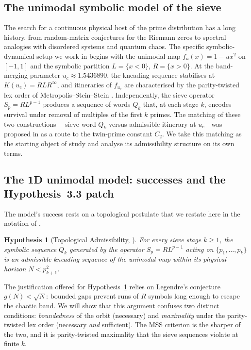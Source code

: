 \documentclass[cupthm,crop,info]{CUP-JNL-ETS}
\theoremstyle{cupplain}
\theoremstyle{cupdefinition}
\newtheorem{hypothesis}[theorem]{Hypothesis}
\theoremstyle{cupremark}
\numberwithin{equation}{section}
\begin{document}
\subsection{The unimodal symbolic model of the sieve}

The search for a continuous physical host of the prime distribution
has a long history, from random-matrix conjectures for the Riemann
zeros to spectral analogies with disordered systems and quantum chaos.
The specific symbolic-dynamical setup we work in begins with the
unimodal map $f_u(x) = 1 - u x^2$ on $[-1, 1]$ and the symbolic
partition $L = \{x < 0\}$, $R = \{x > 0\}$. At the band-merging
parameter $u_c \approx 1.5436890$, the kneading sequence stabilises at
$K(u_c) = RLR^\infty$, and itineraries of $f_{u_c}$ are characterised
by the parity-twisted lex order of Metropolis--Stein--Stein
\cite{metropolis1973finite,milnor1988iterated}. Independently, the
sieve operator $S_p = R L^{p-1}$ produces a sequence of words $Q_k$
that, at each stage $k$, encodes survival under removal of multiples
of the first $k$ primes. The matching of these two constructions---
sieve word $Q_k$ versus admissible itinerary at $u_c$---was proposed
in \cite{wang2026emergence} as a route to the twin-prime constant
$C_2$. We take this matching as the starting object of study and
analyse its admissibility structure on its own terms.

\subsection{The 1D unimodal model: successes and the Hypothesis~3.3 patch}

The model's success rests on a topological postulate that we restate
here in the notation of \cite{wang2026emergence}.

\begin{hypothesis}[Topological Admissibility, \cite{wang2026emergence}]
\label{hyp:33}
For every sieve stage $k \geq 1$, the symbolic sequence $Q_k$ generated
by the operator $S_p = R L^{p-1}$ acting on $\{p_1, \ldots, p_k\}$ is an
admissible kneading sequence of the unimodal map within its physical
horizon $N < p_{k+1}^2$.
\end{hypothesis}

The justification offered for Hypothesis~\ref{hyp:33} relies on
Legendre's conjecture $g(N) < \sqrt{N}$: bounded gaps prevent runs of
$R$ symbols long enough to escape the chaotic band. We will show that
this argument confuses two distinct conditions: \emph{boundedness} of
the orbit (necessary) and \emph{maximality} under the parity-twisted
lex order (necessary \emph{and} sufficient). The MSS criterion is the
sharper of the two, and it is parity-twisted maximality that the sieve
sequences violate at finite $k$.
\end{document}
